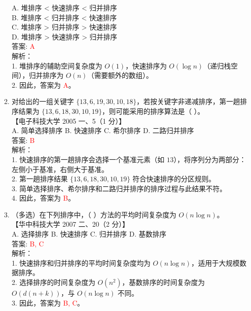 \documentclass[lang=cn,newtx,10pt,scheme=chinese]{../../../elegantbook}
\begin{document}
\begin{enumerate}
    A. 堆排序 < 快速排序 < 归并排序 \\  
    B. 堆排序 < 归并排序 < 快速排序 \\  
    C. 堆排序 > 归并排序 > 快速排序 \\  
    D. 堆排序 > 快速排序 > 归并排序 \\  

    答案: \textcolor{red}{A} \\

    解析：\\
    1. 堆排序的辅助空间复杂度为 $O(1)$，快速排序为 $O(\log n)$（递归栈空间），归并排序为 $O(n)$（需要额外的数组）。\\
    2. 因此，答案为 \textcolor{red}{A}。\\

\item 对给出的一组关键字 $\{13, 6, 19, 30, 10, 18\}$，若按关键字非递减排序，第一趟排序结果为 $\{13, 6, 18, 30, 10, 19\}$，则可能采用的排序算法是（ ）。\\
    【电子科技大学 2005 一、5（1 分）】\\  

    A. 简单选择排序 \quad B. 快速排序 \quad C. 希尔排序 \quad D. 二路归并排序 \\  

    答案: \textcolor{red}{B} \\

    解析：\\
    1. 快速排序的第一趟排序会选择一个基准元素（如 $13$），将序列分为两部分：左侧小于基准，右侧大于基准。\\
    2. 第一趟排序结果 $\{13, 6, 18, 30, 10, 19\}$ 符合快速排序的分区规则。\\
    3. 简单选择排序、希尔排序和二路归并排序的排序过程与此结果不符。\\
    4. 因此，答案为 \textcolor{red}{B}。\\

    \item （多选）在下列排序中，（ ）方法的平均时间复杂度为 $O(n \log n)$。\\
    【华中科技大学 2007 二、20（2 分）】\\  

    A. 选择排序 \quad B. 快速排序 \quad C. 归并排序 \quad D. 基数排序 \\  

    答案: \textcolor{red}{B, C} \\

    解析：\\
    1. 快速排序和归并排序的平均时间复杂度均为 $O(n \log n)$，适用于大规模数据排序。\\
    2. 选择排序的时间复杂度为 $O(n^2)$，基数排序的时间复杂度为 $O(d(n + k))$，与 $O(n \log n)$ 不同。\\
    3. 因此，答案为 \textcolor{red}{B, C}。\\


\end{enumerate}
\end{document}
